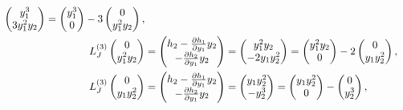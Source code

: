 \documentclass[12pt]{report}
\begin{document}
\begin{solution}
\begin{align*}
\begin{pmatrix}
            y_1^3 \\ 3y_1^2 y_2
        \end{pmatrix} = \begin{pmatrix}
            y_1^3 \\ 0
        \end{pmatrix} - 3\begin{pmatrix}
            0 \\ y_1^2 y_2 
        \end{pmatrix},\\
        L_J^{(3)}
        \begin{pmatrix} 
            0\\y_1^2y_2 
        \end{pmatrix} &= 
        \begin{pmatrix}
            h_2 - \pp{h_1}{y_1}y_2\\
            -\pp{h_2}{y_1} y_2
        \end{pmatrix} = \begin{pmatrix}
            y_1^2y_2 \\ -2y_1 y_2^2
        \end{pmatrix} = \begin{pmatrix}
            y_1^2 y_2 \\ 0
        \end{pmatrix} - 2\begin{pmatrix}
            0 \\ y_1 y_2^2 
        \end{pmatrix},\\
        L_J^{(3)}
        \begin{pmatrix} 
            0\\y_1y_2^2 
        \end{pmatrix} &= 
        \begin{pmatrix}
            h_2 - \pp{h_1}{y_1}y_2\\
            -\pp{h_2}{y_1} y_2
        \end{pmatrix} = \begin{pmatrix}
            y_1 y_2^2\\ -y_2^3
        \end{pmatrix} = \begin{pmatrix}
            y_1 y_2^2 \\ 0
        \end{pmatrix} - \begin{pmatrix}
            0 \\ y_2^3
        \end{pmatrix},\\

\end{align*}
\end{solution}
\end{document}
